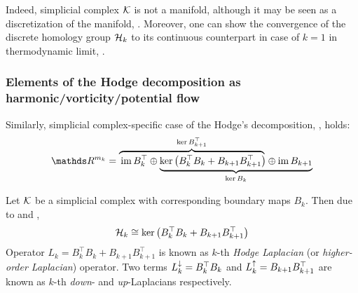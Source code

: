 


Indeed, simplicial complex \( \mathcal{K} \) is not a manifold, although it may be seen as a discretization of the manifold, . Moreover, one can show the convergence of the discrete homology group \( \mathcal{H}_k \) to its continuous counterpart in case of \( k = 1 \) in thermodynamic limit, .



\subsubsection{ Elements of the Hodge decomposition as harmonic/vorticity/potential flow}

Similarly, simplicial complex-specific case of the Hodge's decomposition, , holds:
\begin{equation}
      \ds R^{m_k} = \lefteqn{\overbrace{\phantom{\im B_k^\top \oplus  \ker \left( B_k^\top B_k + B_{k+1} B_{k+1}^\top \right)}}^{\ker B_{k+1}^\top}} \im B_k^\top \oplus
      \underbrace{\ker \left( B_k^\top B_k + B_{k+1} B_{k+1}^\top \right) \oplus  \im B_{k+1}}_{\ker B_k}            
\end{equation}


\begin{definition}
      Let \( \mathcal{K} \) be a simplicial complex with corresponding boundary maps \( B_k \). Then due to  and ,
      \begin{equation}
            \mathcal{H}_k \cong \ker \left( B_k^\top B_k + B_{k+1} B_{k+1}^\top \right)
      \end{equation}
      Operator \( L_k =  B_k^\top B_k + B_{k+1} B_{k+1}^\top \) is known as \(k\)-th \emph{Hodge Laplacian} (or \emph{higher-order Laplacian}) operator. Two terms \( L_{k}^{\downarrow} =B_k^\top B_k  \) and \( L_{k}^{\uparrow} = B_{k+1} B_{k+1}^\top \) are known as \(k\)-th \emph{down}- and \emph{up}-Laplacians respectively.
\end{definition}


